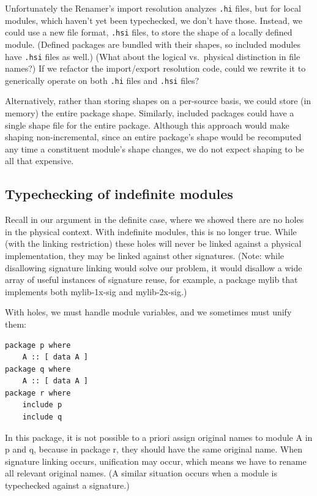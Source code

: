 \documentclass{article}
\begin{document}
Unfortunately the Renamer's import resolution analyzes \verb|.hi| files, but for
local modules, which haven't yet been typechecked, we don't have those.
Instead, we could use a new file format, \verb|.hsi| files, to store the shape of
a locally defined module. (Defined packages are bundled with their shapes,
so included modules have \verb|.hsi| files as well.) (What about the logical
vs.~physical distinction in file names?) If we refactor the import/export
resolution code, could we rewrite it to generically operate on both
\verb|.hi| files and \verb|.hsi| files?

Alternatively, rather than storing shapes on a per-source basis, we could
store (in memory) the entire package shape. Similarly, included packages
could have a single shape file for the entire package. Although this approach
would make shaping non-incremental, since an entire package's shape would
be recomputed any time a constituent module's shape changes, we do not expect
shaping to be all that expensive.

\subsection{Typechecking of indefinite modules}\label{sec:typechecking-indefinite}

Recall in our argument in the definite case, where we showed there are
no holes in the physical context.  With indefinite modules, this is no
longer true. While (with the linking restriction) these holes will never
be linked against a physical implementation, they may be linked against
other signatures.  (Note: while disallowing signature linking would
solve our problem, it would disallow a wide array of useful instances of
signature reuse, for example, a package mylib that implements both
mylib-1x-sig and mylib-2x-sig.)

With holes, we must handle module variables, and we sometimes must unify them:

\begin{verbatim}
package p where
    A :: [ data A ]
package q where
    A :: [ data A ]
package r where
    include p
    include q
\end{verbatim}

In this package, it is not possible to a priori assign original names to
module A in p and q, because in package r, they should have the same
original name.  When signature linking occurs, unification may occur,
which means we have to rename all relevant original names. (A similar
situation occurs when a module is typechecked against a signature.)
\end{document}
